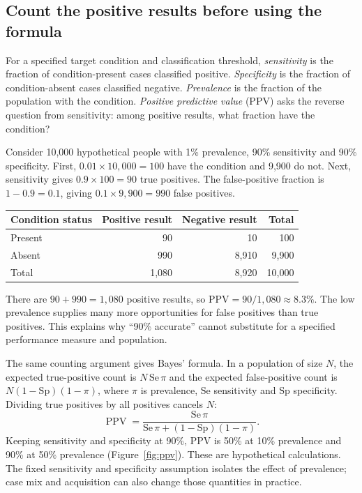 \documentclass[11pt,a4paper]{article}
\begin{document}
\subsection{Count the positive results before using the formula}
For a specified target condition and classification threshold, \emph{sensitivity} is the fraction of condition-present cases classified positive. \emph{Specificity} is the fraction of condition-absent cases classified negative. \emph{Prevalence} is the fraction of the population with the condition. \emph{Positive predictive value} (PPV) asks the reverse question from sensitivity: among positive results, what fraction have the condition?

Consider 10,000 hypothetical people with 1\% prevalence, 90\% sensitivity and 90\% specificity. First, $0.01\times10{,}000=100$ have the condition and 9,900 do not. Next, sensitivity gives $0.9\times100=90$ true positives. The false-positive fraction is $1-0.9=0.1$, giving $0.1\times9{,}900=990$ false positives.

\begin{center}\begin{minipage}{\linewidth}\centering
{}
\begin{tabular}{lrrr}\toprule
Condition status & Positive result & Negative result & Total \\\midrule
Present & 90 & 10 & 100 \\
Absent & 990 & 8,910 & 9,900 \\\midrule
Total & 1,080 & 8,920 & 10,000 \\\bottomrule
\end{tabular}
\end{minipage}\end{center}

There are $90+990=1{,}080$ positive results, so $\mathrm{PPV}=90/1{,}080\approx8.3\%$. The low prevalence supplies many more opportunities for false positives than true positives. This explains why ``90\% accurate'' cannot substitute for a specified performance measure and population.

The same counting argument gives Bayes' formula. In a population of size $N$, the expected true-positive count is $N\,\mathrm{Se}\,\pi$ and the expected false-positive count is $N(1-\mathrm{Sp})(1-\pi)$, where $\pi$ is prevalence, $\mathrm{Se}$ sensitivity and $\mathrm{Sp}$ specificity. Dividing true positives by all positives cancels $N$:
\begin{equation}
\operatorname{PPV}=\frac{\mathrm{Se}\,\pi}{\mathrm{Se}\,\pi+(1-\mathrm{Sp})(1-\pi)}.
\end{equation}
Keeping sensitivity and specificity at 90\%, PPV is 50\% at 10\% prevalence and 90\% at 50\% prevalence (Figure~\ref{fig:ppv}). These are hypothetical calculations. The fixed sensitivity and specificity assumption isolates the effect of prevalence; case mix and acquisition can also change those quantities in practice.
\end{document}
